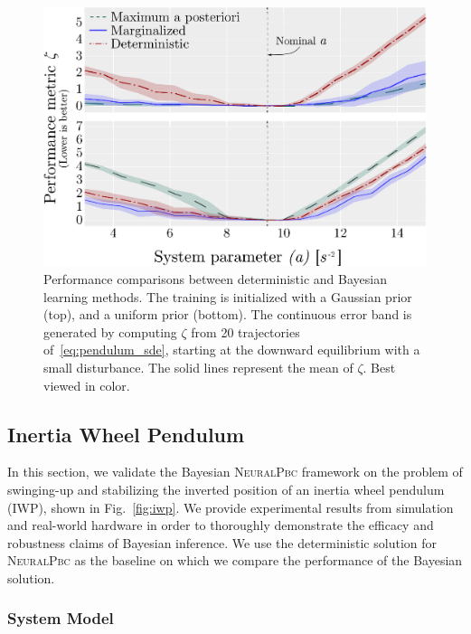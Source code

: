 \begin{figure}[tb]
    \centering
    \includegraphics[width=0.8\linewidth]{figures/H_combined.eps}
    \caption{
        Performance comparisons between deterministic and Bayesian learning
        methods. 
        The training is initialized with a Gaussian prior (top), and a
        uniform prior (bottom). 
        The continuous error band is generated by computing $\zeta$ from 20
        trajectories of~\eqref{eq:pendulum_sde}, starting at the downward
        equilibrium with a small disturbance. 
        The solid lines represent the mean of $\zeta$. 
        Best viewed in color.
    }
    \label{fig:bayes_compare}
\end{figure}
\subsection{Inertia Wheel Pendulum}
\label{subsec:iwp}
In this section, we validate the Bayesian \textsc{NeuralPbc} framework on the
problem of swinging-up and stabilizing the inverted position of an inertia wheel
pendulum (IWP), shown in Fig.~\ref{fig:iwp}. We provide experimental results
from simulation and real-world hardware in order to thoroughly demonstrate the
efficacy and robustness claims of Bayesian inference. 
%
We use the deterministic solution for \textsc{NeuralPbc} as the baseline on
which we compare the performance of the Bayesian solution. 

\subsubsection{System Model}

